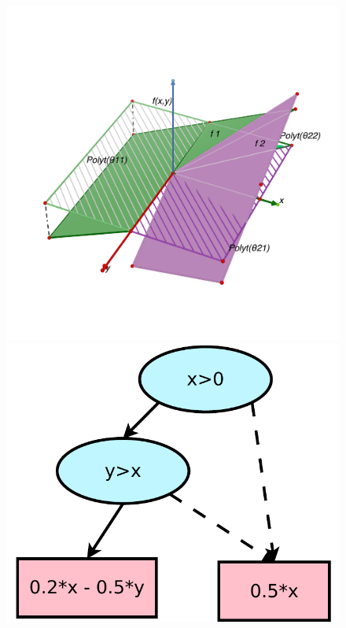 \begin{figure}[t!]
\vspace{-5mm}
\begin{minipage}{0.30\textwidth}
\center
\vspace{-5mm}
\includegraphics[trim = 0cm 0cm 0cm 0cm,width=\textwidth]{Figures/stepfun/PiecewiseLinearEx2.pdf} 
\end{minipage}\hspace{-5mm}
\begin{minipage}{0.18\textwidth}
\center
\vspace{-5mm}
\includegraphics[width=\textwidth]{Figures/xadds/dia2.pdf}
\end{minipage}\\
\vspace{-10mm}


\end{figure}

